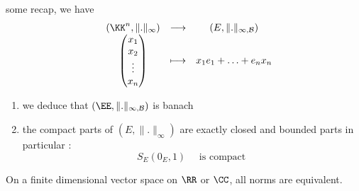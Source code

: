 % 
% 

\lecday[2025-02-20]


% 
some recap, we have 
\[
\begin{array}{cccc}
        &  \left( \KK^{n}, \| . \| _{\infty } \right)  & \longrightarrow & \left( 
       E,\| . \| _{\infty ,\mathcal{B} }\right) \\
           &
	\begin{pmatrix}
		x_1 \\
		x_2 \\
		 \vdots \\
		 x_{n}\\
	\end{pmatrix}
	   & \longmapsto     &  x_1 e_1 + \hdots + e_{n}x_{n}\\ 
\end{array}
\]
\begin{enumerate}
\item we deduce that $\left( \EE , \| . \| _{\infty , \mathcal{B} } \right)$  is
	banach
\item the compact parts of $\left( E, \| . \| _{\infty} \right)$ 
	are exactly closed and bounded parts  in particular :
\[
S_{E} \left( 0_{E},1 \right) \quad 
\text{ is compact } 
\]
\end{enumerate}
\begin{theorem}[]
On a finite dimensional vector space on $\RR $ or $\CC $, all norms
are equivalent.
\end{theorem}
